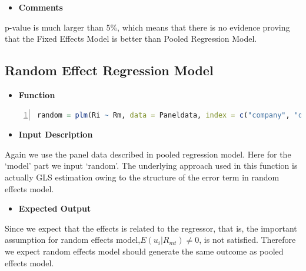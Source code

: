     \begin{itemize}
    \item \textbf{Comments}
    \end{itemize}
    p-value is much larger than 5\%, which means that there is no evidence proving that the Fixed Effects Model is better than Pooled Regression Model.\\

    \subsection{Random Effect Regression Model}
    \begin{itemize}
    \item \textbf{Function}
    \end{itemize}
    \begin{lstlisting}[language=R,numbers=left, numberstyle=\normalsize]
random = plm(Ri ~ Rm, data = Paneldata, index = c("company", "date"), model = "random")
    \end{lstlisting}
    \begin{itemize}
    \item \textbf{Input Description}
    \end{itemize}
    Again we use the panel data described in pooled regression model. Here for the `model' part we input `random'. The underlying approach used in this function is actually GLS estimation owing to the structure of the error term in random effects model.\\

    \begin{itemize}
    \item \textbf{Expected Output}
    \end{itemize}
    Since we expect that the effects is related to the regressor, that is, the important assumption for random effects model,$E(u_i|R_{mt})\neq 0$, is not satisfied. Therefore we expect random effects model should generate the same outcome as pooled effects model.\\

